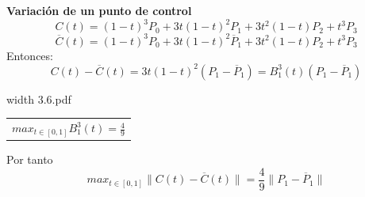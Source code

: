\documentclass[twoside]{report}
\newcommand{\colocapdf}[2]{\quad\pdfimage width #2 {#1.pdf}}
\begin{document}
%
%
%
%
%
%
%
{\bf Variaci\'{o}n de un punto de control}
$$C(t)=(1-t)^3P_0+3t(1-t)^2P_1+3t^2(1-t)P_2+t^3P_3$$
$$\overline{C}(t)=(1-t)^3P_0+3t(1-t)^2\overline{P}_1+3t^2(1-t)P_2+t^3P_3$$
Entonces:
$$C(t)-\overline{C}(t)=3t(1-t)^2(P_1-\overline{P}_1)=B_1^3(t)(P_1-\overline{P}_1)$$
\begin{center}
\begin{minipage}{.2\textwidth}\colocapdf{3.6}{\textwidth}
\end{minipage}
\begin{minipage}{0.55\textwidth}
\begin{tabular}{c} $max_{t\in[0,1]}B_1^3(t)=\frac{4}{9}$
\end{tabular}
\end{minipage}
\end{center}
Por tanto
$$max_{t\in[0,1]}\parallel C(t)-\overline{C}(t)\parallel
=\frac{4}{9}\parallel P_1-\overline{P}_1\parallel$$
\end{document}
